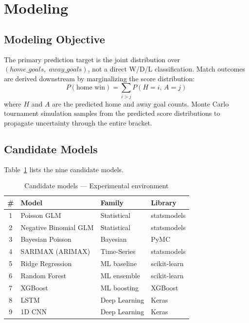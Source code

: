 \documentclass[conference]{IEEEtran}
\begin{document}
\section{Modeling}
\label{sec:modeling}

\subsection{Modeling Objective}

The primary prediction target is the joint distribution over
$(home\_goals,\; away\_goals)$, not a direct W/D/L classification.
Match outcomes are derived downstream by marginalizing the score distribution:
\begin{equation}
  P(\text{home win}) = \sum_{i > j} P(H=i,\, A=j)
\end{equation}
where $H$ and $A$ are the predicted home and away goal counts.
Monte Carlo tournament simulation samples from the predicted score distributions
to propagate uncertainty through the entire bracket.

\subsection{Candidate Models}

Table~\ref{tab:models} lists the nine candidate models.

\begin{table}[h]
  \centering
  \caption{Candidate models — Experimental environment}
  \label{tab:models}
  \begin{tabular}{clll}
    \toprule
    \# & Model & Family & Library \\
    \midrule
    1 & Poisson GLM         & Statistical   & statsmodels \\
    2 & Negative Binomial GLM & Statistical & statsmodels \\
    3 & Bayesian Poisson    & Bayesian      & PyMC        \\
    4 & SARIMAX (ARIMAX)    & Time-Series   & statsmodels \\
    5 & Ridge Regression    & ML baseline   & scikit-learn \\
    6 & Random Forest       & ML ensemble   & scikit-learn \\
    7 & XGBoost             & ML boosting   & XGBoost      \\
    8 & LSTM                & Deep Learning & Keras        \\
    9 & 1D CNN              & Deep Learning & Keras        \\
    \bottomrule
  \end{tabular}
\end{table}
\end{document}
